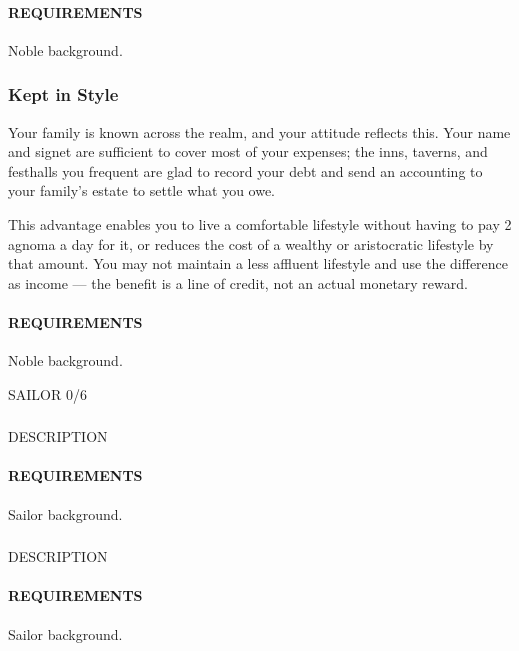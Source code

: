     \paragraph{REQUIREMENTS} Noble background.

    \subsubsection{Kept in Style} \label{feat::keptinstyle}
    Your family is known across the realm, and your attitude reflects this.
    Your name and signet are sufficient to cover most of your expenses; the inns, taverns, and festhalls you frequent are glad to record your debt and send an accounting to your family's estate to settle what you owe.

    This advantage enables you to live a comfortable lifestyle without having to pay 2 agnoma a day for it, or reduces the cost of a wealthy or aristocratic lifestyle by that amount.
    You may not maintain a less affluent lifestyle and use the difference as income --- the benefit is a line of credit, not an actual monetary reward.
    \paragraph{REQUIREMENTS} Noble background.

SAILOR 0/6
    \subsubsection{} \label{feat::NAME}
    DESCRIPTION
    \paragraph{REQUIREMENTS} Sailor background.

    \subsubsection{} \label{feat::NAME}
    DESCRIPTION
    \paragraph{REQUIREMENTS} Sailor background.

